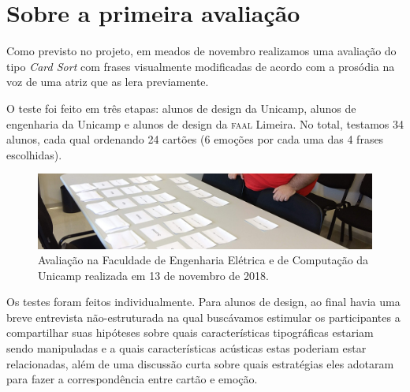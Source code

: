 \documentclass[a4paper,11pt,titlepage,singlespacing]{article}
\begin{document}
{\color{pos_parecer}

    \newpage


    \section{Sobre a primeira avaliação}

    Como previsto no projeto, em meados de novembro realizamos uma avaliação do tipo \textit{Card Sort} com frases visualmente modificadas de acordo com a prosódia na voz de uma atriz que as lera previamente. 
    
    O teste foi feito em três etapas: alunos de design da Unicamp, alunos de engenharia da Unicamp e alunos de design da \textsc{faal} Limeira. No total, testamos 34 alunos, cada qual ordenando 24 cartões (6 emoções por cada uma das 4 frases escolhidas).
    
    
    \begin{figure}[!ht]    
        \centering
        \label{fig:card_sort}
        \captionsetup{width=\textwidth}
            \includegraphics[width=1\textwidth]{fig/card_sort.jpg}
            
        \caption{Avaliação na Faculdade de Engenharia Elétrica e de Computação da Unicamp realizada em 13 de novembro de 2018.}
    \end{figure}
    

    
    Os testes foram feitos individualmente. Para alunos de design, ao final havia uma breve entrevista não-estruturada na qual buscávamos estimular os participantes a compartilhar suas hipóteses sobre quais características tipográficas estariam sendo manipuladas e a quais características acústicas estas poderiam estar relacionadas, além de uma discussão curta sobre quais estratégias eles adotaram para fazer a correspondência entre cartão e emoção.
    
}
\end{document}
